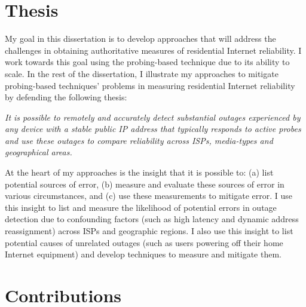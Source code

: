 
\section{Thesis}


My goal in this dissertation is to develop approaches that will
address the challenges in obtaining authoritative measures of
residential Internet reliability. I work towards this goal using the
probing-based technique due to its ability to scale. In the rest of
the dissertation, I illustrate my approaches to mitigate probing-based
techniques' problems in measuring residential Internet reliability
by defending the following thesis:

\emph{It is possible to remotely and accurately detect substantial outages
  experienced by any device with a stable public IP address that typically
  responds to active probes and use these outages to compare
  reliability across ISPs, media-types and geographical areas.} 


At the heart of my approaches is the insight that it is possible to: (a) list
potential sources of error, (b) measure and evaluate these sources of
error in various circumstances, and (c) use these
measurements to mitigate error. I use this insight to list and
measure the likelihood of potential errors in outage detection due
to confounding factors (such as high latency and dynamic address reassignment) across ISPs and
geographic regions. I also use this insight to list potential causes
of unrelated outages (such as users powering off their
home Internet equipment) and develop techniques to 
measure and mitigate them. %


\section{Contributions}

